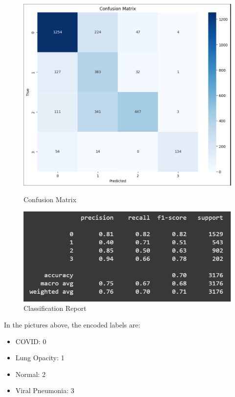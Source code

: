 \documentclass{article}
\begin{document}
\begin{figure}[H]
    \centering
    \begin{minipage}[t]{0.48\textwidth}
        \centering
        \includegraphics[width=\linewidth]{DN121cm1.png}
        \caption{Confusion Matrix}
        \label{fig:DN121cm1}
    \end{minipage}
    \hfill
    \begin{minipage}[t]{0.48\textwidth}
        \centering
        \includegraphics[width=\linewidth]{DN121cr1.png}
        \caption{Classification Report}
        \label{fig:DN121cr1}
    \end{minipage}
\end{figure}

In the pictures above, the encoded labels are:
\begin{itemize}
    \item COVID: 0
    \item Lung Opacity: 1
    \item Normal: 2
    \item Viral Pneumonia: 3
\end{itemize}
\end{document}
